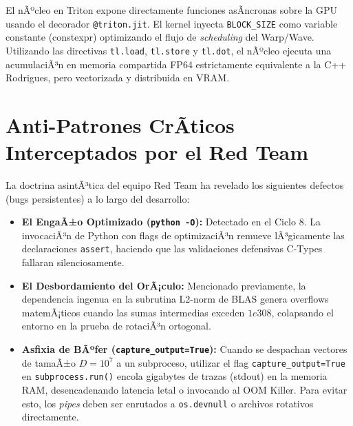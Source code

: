El nÃºcleo en Triton expone directamente funciones asÃ­ncronas sobre la GPU usando el decorador \texttt{@triton.jit}. El kernel inyecta \texttt{BLOCK\_SIZE} como variable constante (constexpr) optimizando el flujo de \textit{scheduling} del Warp/Wave. Utilizando las directivas \texttt{tl.load}, \texttt{tl.store} y \texttt{tl.dot}, el nÃºcleo ejecuta una acumulaciÃ³n en memoria compartida FP64 estrictamente equivalente a la C++ Rodrigues, pero vectorizada y distribuida en VRAM.

\section{Anti-Patrones CrÃ­ticos Interceptados por el Red Team}
\label{sec:anti_patterns}

La doctrina asintÃ³tica del equipo Red Team ha revelado los siguientes defectos (bugs persistentes) a lo largo del desarrollo:
\begin{itemize}
    \item \textbf{El EngaÃ±o Optimizado (\texttt{python -O}):} Detectado en el Ciclo 8. La invocaciÃ³n de Python con flags de optimizaciÃ³n remueve lÃ³gicamente las declaraciones \texttt{assert}, haciendo que las validaciones defensivas C-Types fallaran silenciosamente. 
    \item \textbf{El Desbordamiento del OrÃ¡culo:} Mencionado previamente, la dependencia ingenua en la subrutina L2-norm de BLAS genera overflows matemÃ¡ticos cuando las sumas intermedias exceden \(1e308\), colapsando el entorno en la prueba de rotaciÃ³n ortogonal.
    \item \textbf{Asfixia de BÃºfer (\texttt{capture\_output=True}):} Cuando se despachan vectores de tamaÃ±o \(D=10^7\) a un subproceso, utilizar el flag \texttt{capture\_output=True} en \texttt{subprocess.run()} encola gigabytes de trazas (stdout) en la memoria RAM, desencadenando latencia letal o invocando al OOM Killer. Para evitar esto, los \textit{pipes} deben ser enrutados a \texttt{os.devnull} o archivos rotativos directamente.
\end{itemize}